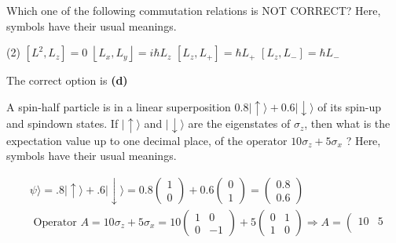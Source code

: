 \begin{enumerate}
\begin{minipage}{\textwidth}
	\item Which one of the following commutation relations is NOT CORRECT? Here, symbols have their usual meanings.
\end{minipage}
\begin{tasks}(2)
	\task[\textbf{A.}] $\left[L^{2}, L_{z}\right]=0$
	\task[\textbf{B.}]$\left\lfloor L_{x}, L_{y}\right\rfloor=i \hbar L_{z}$
	\task[\textbf{C.}]$\left[L_{z}, L_{+}\right]=\hbar L_{+}$
	\task[\textbf{D.}]$\left[L_{z}, L_{-}\right]=\hbar L_{-}$
\end{tasks}
\begin{answer}
The correct option is \textbf{(d)}	
\end{answer}
\begin{minipage}{\textwidth}
	\item A spin-half particle is in a linear superposition $0.8|\uparrow\rangle+0.6|\downarrow\rangle$ of its spin-up and spindown states. If $|\uparrow\rangle$ and $|\downarrow\rangle$ are the eigenstates of $\sigma_{z}$, then what is the expectation value up to one decimal place, of the operator $10 \sigma_{z}+5 \sigma_{x}$ ? Here, symbols have their usual meanings.
\end{minipage}
\begin{answer}
\begin{align*}
	&\psi\rangle=.8|\uparrow\rangle+.6|\downarrow\rangle=0.8\left(\begin{array}{l}
		1 \\
		0
	\end{array}\right)+0.6\left(\begin{array}{l}
		0 \\
		1
	\end{array}\right)=\left(\begin{array}{l}
		0.8 \\
		0.6
	\end{array}\right) \\
	&\text { Operator } A=10 \sigma_{z}+5 \sigma_{x}=10\left(\begin{array}{cc}
		1 & 0 \\
		0 & -1
	\end{array}\right)+5\left(\begin{array}{ll}
		0 & 1 \\
		1 & 0
	\end{array}\right) \Rightarrow A=\left(\begin{array}{cc}
		10 & 5 \\

\end{array}
\end{align*}
\end{answer}
\end{enumerate}
